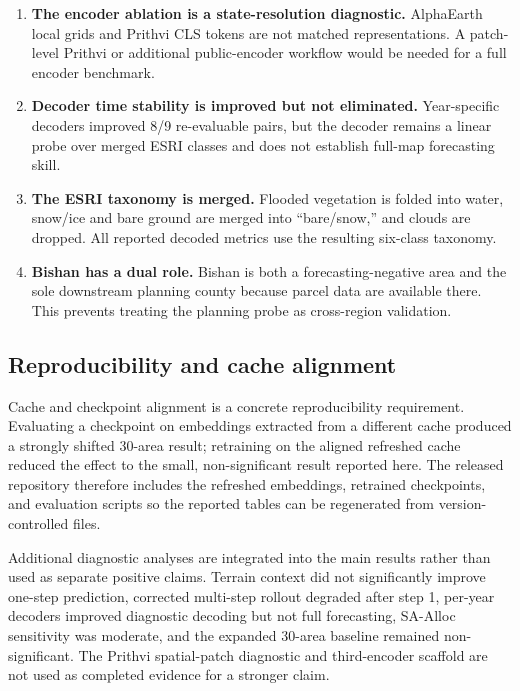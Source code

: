 \documentclass{article}
\begin{document}
\begin{enumerate}
\item \label{lim:encoder_ablation} \textbf{The encoder ablation is a state-resolution diagnostic.} AlphaEarth local grids and Prithvi CLS tokens are not matched representations. A patch-level Prithvi or additional public-encoder workflow would be needed for a full encoder benchmark.

\item \label{lim:decoder_stability} \textbf{Decoder time stability is improved but not eliminated.} Year-specific decoders improved 8/9 re-evaluable pairs, but the decoder remains a linear probe over merged ESRI classes and does not establish full-map forecasting skill.

\item \label{lim:esri_classes} \textbf{The ESRI taxonomy is merged.} Flooded vegetation is folded into water, snow/ice and bare ground are merged into ``bare/snow,'' and clouds are dropped. All reported decoded metrics use the resulting six-class taxonomy.

\item \label{lim:bishan_role} \textbf{Bishan has a dual role.} Bishan is both a forecasting-negative area and the sole downstream planning county because parcel data are available there. This prevents treating the planning probe as cross-region validation.
\end{enumerate}

\subsection{Reproducibility and cache alignment}
\label{sec:reproducibility_discussion}

Cache and checkpoint alignment is a concrete reproducibility requirement. Evaluating a checkpoint on embeddings extracted from a different cache produced a strongly shifted 30-area result; retraining on the aligned refreshed cache reduced the effect to the small, non-significant result reported here. The released repository therefore includes the refreshed embeddings, retrained checkpoints, and evaluation scripts so the reported tables can be regenerated from version-controlled files.

Additional diagnostic analyses are integrated into the main results rather than used as separate positive claims. Terrain context did not significantly improve one-step prediction, corrected multi-step rollout degraded after step 1, per-year decoders improved diagnostic decoding but not full forecasting, SA-Alloc sensitivity was moderate, and the expanded 30-area baseline remained non-significant. The Prithvi spatial-patch diagnostic and third-encoder scaffold are not used as completed evidence for a stronger claim.
\end{document}
